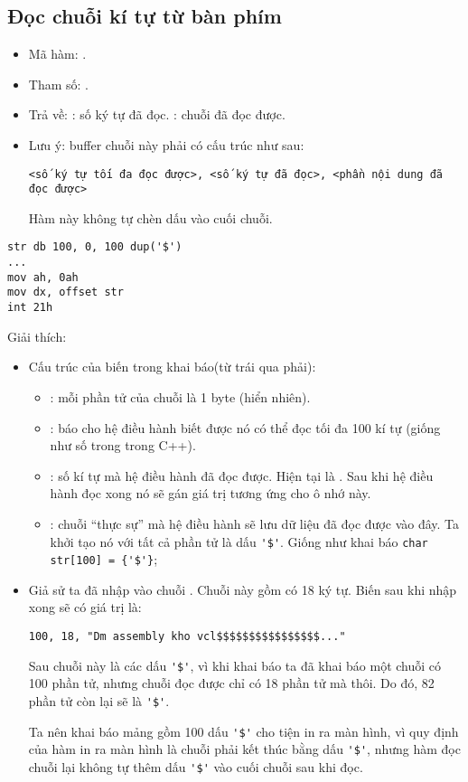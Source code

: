\documentclass[main.tex]{subfiles}
\begin{document}
\subsection{Đọc chuỗi kí tự từ bàn phím} \label{subsec:docchuoi}
\begin{itemize}
    \item Mã hàm: .
    \item Tham số: .
    \item Trả về: \cd{[DX+1]}: số ký tự đã đọc. \cd{[DX+2]}: chuỗi đã đọc được.
    \item Lưu ý: buffer chuỗi này phải có cấu trúc như sau:
    \begin{verbatim}
<số ký tự tối đa đọc được>, <số ký tự đã đọc>, <phần nội dung đã đọc được>
    \end{verbatim}
    \par Hàm này không tự chèn dấu  vào cuối chuỗi.
\end{itemize}
\begin{verbatim}
str db 100, 0, 100 dup('$')
...
mov ah, 0ah 
mov dx, offset str 
int 21h
\end{verbatim}
Giải thích:
\begin{itemize}
    \item Cấu trúc của biến  trong khai báo(từ trái qua phải):
    \begin{itemize}
        \item {}: mỗi phần tử của chuỗi là 1 byte (hiển nhiên).
        \item {}: báo cho hệ điều hành biết được nó có thể đọc tối đa 100 kí tự (giống như số  trong  trong C++).
        \item {}: số kí tự mà hệ điều hành đã đọc được. Hiện tại là . Sau khi hệ điều hành đọc xong nó sẽ gán giá trị tương ứng cho ô nhớ này.
        \item {}: chuỗi ``thực sự'' mà hệ điều hành sẽ lưu dữ liệu đã đọc được vào đây. Ta khởi tạo nó với tất cả phần tử là dấu \verb#'$'#. Giống như khai báo \verb#char str[100] = {'$'}#;
    \end{itemize}
    \item Giả sử ta đã nhập vào chuỗi . Chuỗi này gồm có 18 ký tự. Biến  sau khi nhập xong sẽ có giá trị là:
    \begin{verbatim}
100, 18, "Dm assembly kho vcl$$$$$$$$$$$$$$$$..."
    \end{verbatim} 
    \par Sau chuỗi này là các dấu  \verb#'$'#, vì khi khai báo ta đã khai báo một chuỗi có 100 phần tử, nhưng chuỗi đọc được chỉ có 18 phần tử mà thôi. Do đó, 82 phần tử còn lại sẽ là \verb#'$'#.
    \par Ta nên khai báo mảng gồm 100 dấu \verb#'$'# cho tiện in ra màn hình, vì quy định của hàm in ra màn hình là chuỗi phải kết thúc bằng dấu \verb#'$'#, nhưng hàm đọc chuỗi lại không tự thêm dấu \verb#'$'# vào cuối chuỗi sau khi đọc.
\end{itemize}
\end{document}
